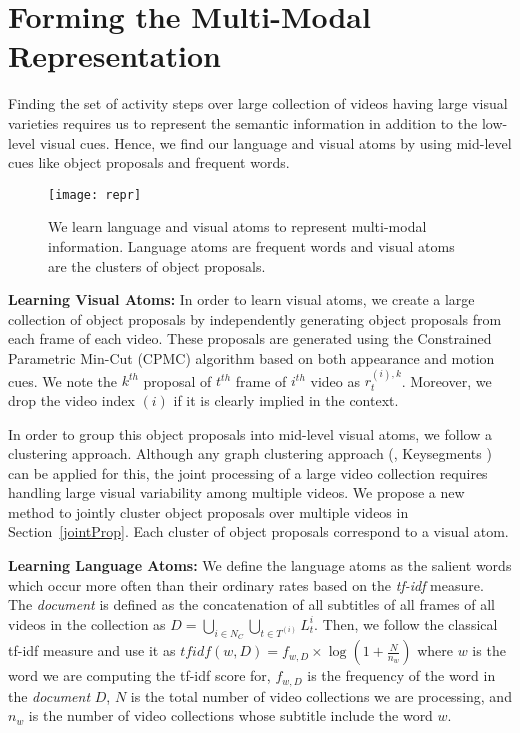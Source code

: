 
\vspace{-1mm}
\section{Forming the Multi-Modal Representation}
\label{atoms}
\vspace{-1mm}

Finding the set of activity steps over large collection of videos having large visual varieties requires us to represent the semantic information in addition to the low-level visual cues. Hence, we find our language and visual atoms by using mid-level cues like object proposals and frequent words.

\begin{figure}[h]
  \texttt{[image: repr]}
  \vspace{-8mm}
  \caption{We learn language and visual atoms to represent multi-modal information. Language atoms are frequent words and visual atoms are the clusters of object proposals.}
  \vspace{-3mm}
\label{fig:overview}
\end{figure}

\noindent\textbf{Learning Visual Atoms:} In order to learn visual atoms, we create a large collection of object proposals by independently generating object proposals from each frame of each video. These proposals are generated using the Constrained Parametric Min-Cut (CPMC) \cite{cpmc} algorithm based on both appearance and motion cues. We note the $k^{th}$ proposal of $t^{th}$ frame of $i^{th}$ video as $r^{(i),k}_t$. Moreover, we drop the video index $(i)$ if it is clearly implied in the context.

In order to group this object proposals into mid-level visual atoms, we follow a clustering approach. Although any graph clustering approach (\eg, Keysegments \cite{keysegments}) can be applied for this, the joint processing of a large video collection requires handling large visual variability among multiple videos. We propose a new method to jointly cluster object proposals over multiple videos in Section~\ref{jointProp}. Each cluster of object proposals correspond to a visual atom.

\noindent\textbf{Learning Language Atoms:}
We define the language atoms as the salient words which occur more often than their ordinary rates based on the \emph{tf-idf} measure. The \emph{document} is defined as the concatenation of all subtitles of all frames of all videos in the collection as $D=\bigcup_{i \in N_C} \bigcup_{t \in T^{(i)}} L_t^i$. Then, we follow the classical tf-idf measure and use it as $tfidf(w,D)=f_{w,D} \times \log \left( 1+ \frac{N}{n_{w}}\right)$ where $w$ is the word we are computing the tf-idf score for, $f_{w,D}$ is the frequency of the word in the \emph{document} $D$, $N$ is the total number of video collections we are processing, and $n_{w}$ is the number of video collections whose subtitle include the word $w$.

